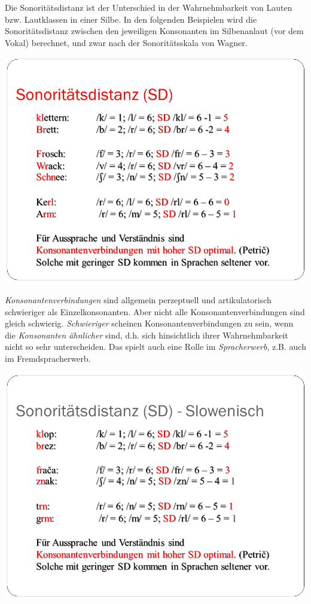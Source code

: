 \documentclass[
  letterpaper,
]{scrbook}
\begin{document}
Die Sonoritätsdistanz ist der Unterschied in der Wahrnehmbarkeit von
Lauten bzw. Lautklassen in einer Silbe. In den folgenden Beispielen wird
die Sonoritätsdistanz zwischen den jeweiligen Konsonanten im
Silbenanlaut (vor dem Vokal) berechnet, und zwar nach der
Sonoritätsskala von Wagner.

\includegraphics[width=1\textwidth,height=\textheight]{./pictures/Wagner_Maas_Duden_Petric_12.PNG}

\emph{Konsonantenverbindungen} sind allgemein perzeptuell und
artikulatorisch schwieriger als Einzelkonsonanten. Aber nicht alle
Konsonantenverbindungen sind gleich schwierig. \emph{Schwieriger}
scheinen Konsonantenverbindungen zu sein, wenn die \emph{Konsonanten
ähnlicher} sind, d.h. sich hinsichtlich ihrer Wahrnehmbarkeit nicht so
sehr unterscheiden. Das spielt auch eine Rolle im \emph{Spracherwerb},
z.B. auch im Fremdspracherwerb.

\includegraphics[width=1\textwidth,height=\textheight]{./pictures/Wagner_Maas_Duden_Petric_13.PNG}
\end{document}

